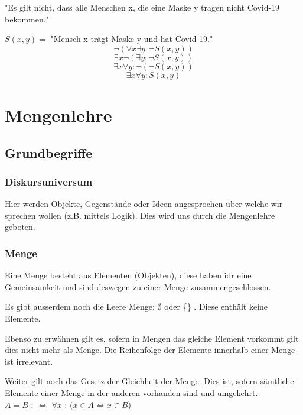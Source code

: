 \documentclass[a4paper,12pt]{article}
\begin{document}
"Es gilt nicht, dass alle Menschen x, die eine Maske y tragen nicht Covid-19 bekommen."

$S(x, y) =$ "Mensch x trägt Maske y und hat Covid-19." 
\begin{displaymath}
  \neg ( \forall x \exists y  : \neg S(x, y))
\end{displaymath}
\begin{displaymath}
  \exists x \neg (\exists y  :  \neg S(x, y))
\end{displaymath}
\begin{displaymath}
  \exists x  \forall y  :  \neg (\neg S(x, y))
\end{displaymath}
\begin{displaymath}
  \exists x  \forall y  :   S(x, y)
\end{displaymath}

\newpage
\section{Mengenlehre}

\subsection{Grundbegriffe}

\subsubsection{Diskursuniversum}
Hier werden Objekte, Gegenstände oder Ideen angesprochen über welche wir sprechen wollen (z.B. mittels Logik). Dies wird uns durch die Mengenlehre geboten.

\subsubsection{Menge}
Eine Menge besteht aus Elementen (Objekten), diese haben idr eine Gemeinsamkeit und sind deswegen zu einer Menge zusammengeschlossen.

Es gibt ausserdem noch die Leere Menge:  $\emptyset$ oder \{\} . Diese enthält keine Elemente.

Ebenso zu erwähnen gilt es, sofern in Mengen das gleiche Element vorkommt gilt dies nicht mehr als Menge. Die Reihenfolge der Elemente innerhalb einer Menge ist irrelevant.

Weiter gilt noch das Gesetz der Gleichheit der Menge. Dies ist, sofern sämtliche Elemente einer Menge in der anderen vorhanden sind und umgekehrt. \\
$A = B$ :  $\Leftrightarrow$  $\forall x$ : \((x \in  A \Leftrightarrow x \in  B\))
\end{document}
